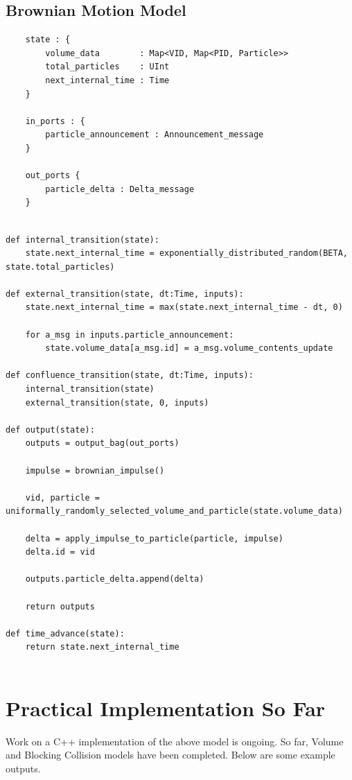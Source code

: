 \documentclass[conference]{IEEEtran}
\begin{document}
\subsection{Brownian Motion Model}
\begin{lstlisting}
	state : {
		volume_data        : Map<VID, Map<PID, Particle>>
		total_particles    : UInt
		next_internal_time : Time
	}
	
	in_ports : {
		particle_announcement : Announcement_message
	}
	
	out_ports {
		particle_delta : Delta_message
	}
\end{lstlisting}
\begin{lstlisting}[style=Python]
	
def internal_transition(state):
	state.next_internal_time = exponentially_distributed_random(BETA, state.total_particles)
	
def external_transition(state, dt:Time, inputs):
	state.next_internal_time = max(state.next_internal_time - dt, 0)
	
	for a_msg in inputs.particle_announcement:
		state.volume_data[a_msg.id] = a_msg.volume_contents_update
		
def confluence_transition(state, dt:Time, inputs):
	internal_transition(state)
	external_transition(state, 0, inputs)
	
def output(state):
	outputs = output_bag(out_ports)
	
	impulse = brownian_impulse()
	
	vid, particle = uniformally_randomly_selected_volume_and_particle(state.volume_data)
	
	delta = apply_impulse_to_particle(particle, impulse)
	delta.id = vid
	
	outputs.particle_delta.append(delta)
	
	return outputs
	
def time_advance(state):
	return state.next_internal_time
	
\end{lstlisting}

\section{Practical Implementation So Far}

Work on a C++ implementation of the above model is ongoing. So far, Volume and Blocking Collision models have been completed. Below are some example outputs.
\end{document}

